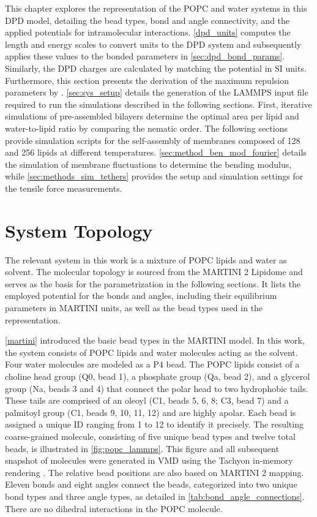 \documentclass[
    11pt,
    a4paper,
    oneside,        %
    BCOR=10mm,      %
    parskip=half,   %
    listof=nototoc,   %
    bibliography=totoc %
]{scrreprt}
\begin{document}
This chapter explores the representation of the POPC and water systems in this DPD model, detailing the bead types, bond and angle connectivity, and the applied potentials for intramolecular interactions. \cref{dpd_units} computes the length and energy scales to convert units to the DPD system and subsequently applies these values to the bonded parameters in \cref{sec:dpd_bond_params}. Similarly, the DPD charges are calculated by matching the potential in SI units. Furthermore, this section presents the derivation of the maximum repulsion parameters by \citeauthor{Wang2024} \cite{Wang2024}. \cref{sec:sys_setup} details the generation of the LAMMPS input file required to run the simulations described in the following sections. First, iterative simulations of pre-assembled bilayers determine the optimal area per lipid and water-to-lipid ratio by comparing the nematic order. The following sections provide simulation scripts for the self-assembly of membranes composed of 128 and 256 lipids at different temperatures. \cref{sec:method_ben_mod_fourier} details the simulation of membrane fluctuations to determine the bending modulus, while \cref{sec:methods_sim_tethers} provides the setup and simulation settings for the tensile force measurements.

\section{System Topology}\label{topology}

The relevant system in this work is a mixture of POPC lipids and water as solvent. The molecular topology is sourced from the MARTINI 2 Lipidome \cite{Martini,lipidome_paper} and serves as the basis for the parametrization in the following sections. It lists the employed potential for the bonds and angles, including their equilibrium parameters in MARTINI units, as well as the bead types used in the representation.

\cref{martini} introduced the basic bead types in the MARTINI model. In this work, the system consists of POPC lipids and water molecules acting as the solvent. Four water molecules are modeled as a P4 bead. The POPC lipids consist of a choline head group (Q0, bead 1), a phosphate group (Qa, bead 2), and a glycerol group (Na, beads 3 and 4) that connect the polar head to two hydrophobic tails. These tails are comprised of an oleoyl (C1, beads 5, 6, 8; C3, bead 7) and a palmitoyl group (C1, beads 9, 10, 11, 12) and are highly apolar. Each bead is assigned a unique ID ranging from 1 to 12 to identify it precisely. The resulting coarse-grained molecule, consisting of five unique bead types and twelve total beads, is illustrated in \cref{fig:popc_lammps}. This figure and all subsequent snapshot of molecules were generated in VMD \cite{vmd} using the Tachyon in-memory rendering \cite{tachyon}. The relative bead positions are also based on MARTINI 2 \cite{Martini,lipidome_paper} mapping. Eleven bonds and eight angles connect the beads, categorized into two unique bond types and three angle types, as detailed in \cref{tab:bond_angle_connections}. There are no dihedral interactions in the POPC molecule.
\end{document}
